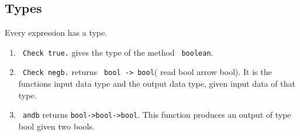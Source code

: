      \subsection{Types}
     Every expression has a type.
     \begin{enumerate}
     \item  \lstinline! Check true.! gives the type of the method \lstinline! boolean!.
     \item \lstinline! Check negb.! returns \lstinline! bool -> bool!( read \glqq bool arrow bool\grqq).
      It is the functions input data type and the output data type, given input data of that type.
      \item \lstinline! andb! returns \lstinline!bool->bool->bool!. This function produces an output of type bool given two bools.
     \end{enumerate}
     
     
     